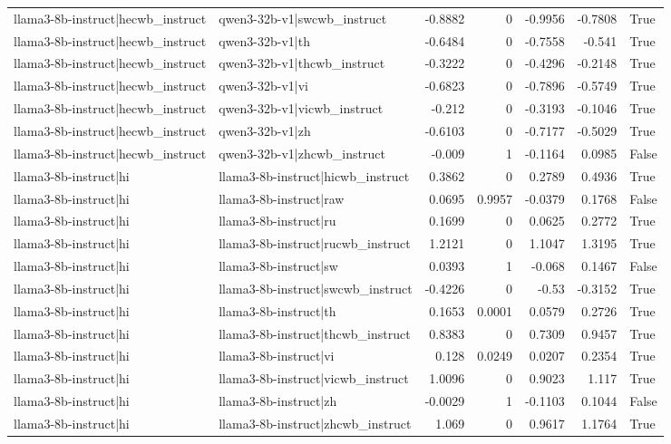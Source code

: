 \begin{table}
\begin{tabular}{l l r r r r l}
llama3-8b-instruct|hecwb_instruct & qwen3-32b-v1|swcwb_instruct & -0.8882 & 0 & -0.9956 & -0.7808 & True \\
llama3-8b-instruct|hecwb_instruct & qwen3-32b-v1|th & -0.6484 & 0 & -0.7558 & -0.541 & True \\
llama3-8b-instruct|hecwb_instruct & qwen3-32b-v1|thcwb_instruct & -0.3222 & 0 & -0.4296 & -0.2148 & True \\
llama3-8b-instruct|hecwb_instruct & qwen3-32b-v1|vi & -0.6823 & 0 & -0.7896 & -0.5749 & True \\
llama3-8b-instruct|hecwb_instruct & qwen3-32b-v1|vicwb_instruct & -0.212 & 0 & -0.3193 & -0.1046 & True \\
llama3-8b-instruct|hecwb_instruct & qwen3-32b-v1|zh & -0.6103 & 0 & -0.7177 & -0.5029 & True \\
llama3-8b-instruct|hecwb_instruct & qwen3-32b-v1|zhcwb_instruct & -0.009 & 1 & -0.1164 & 0.0985 & False \\
llama3-8b-instruct|hi & llama3-8b-instruct|hicwb_instruct & 0.3862 & 0 & 0.2789 & 0.4936 & True \\
llama3-8b-instruct|hi & llama3-8b-instruct|raw & 0.0695 & 0.9957 & -0.0379 & 0.1768 & False \\
llama3-8b-instruct|hi & llama3-8b-instruct|ru & 0.1699 & 0 & 0.0625 & 0.2772 & True \\
llama3-8b-instruct|hi & llama3-8b-instruct|rucwb_instruct & 1.2121 & 0 & 1.1047 & 1.3195 & True \\
llama3-8b-instruct|hi & llama3-8b-instruct|sw & 0.0393 & 1 & -0.068 & 0.1467 & False \\
llama3-8b-instruct|hi & llama3-8b-instruct|swcwb_instruct & -0.4226 & 0 & -0.53 & -0.3152 & True \\
llama3-8b-instruct|hi & llama3-8b-instruct|th & 0.1653 & 0.0001 & 0.0579 & 0.2726 & True \\
llama3-8b-instruct|hi & llama3-8b-instruct|thcwb_instruct & 0.8383 & 0 & 0.7309 & 0.9457 & True \\
llama3-8b-instruct|hi & llama3-8b-instruct|vi & 0.128 & 0.0249 & 0.0207 & 0.2354 & True \\
llama3-8b-instruct|hi & llama3-8b-instruct|vicwb_instruct & 1.0096 & 0 & 0.9023 & 1.117 & True \\
llama3-8b-instruct|hi & llama3-8b-instruct|zh & -0.0029 & 1 & -0.1103 & 0.1044 & False \\
llama3-8b-instruct|hi & llama3-8b-instruct|zhcwb_instruct & 1.069 & 0 & 0.9617 & 1.1764 & True \\

\end{tabular}
\end{table}
